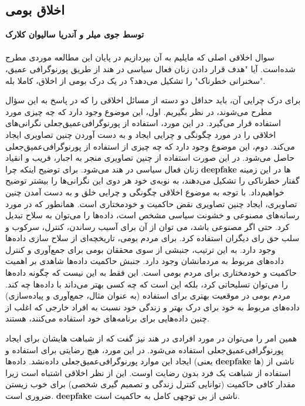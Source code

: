 {
\subsection*{اخلاق بومی}
\label{subsec:اخلاق بومی}
\noindent \textbf{توسط جوی میلر و آندریا سالیوان کلارک}
\\\\
سوال اخلاقی اصلی که مایلیم به آن بپردازیم در پایان این مطالعه موردی مطرح شده‌است. آیا "هدف قرار دادن زنان فعال سیاسی در هند از طریق پورنوگرافی عمیق، "سخنرانی خطرناک" را تشکیل می‌دهد؟ در یک درک بومی از اخلاق، کاملا بله.
}

برای درک چرایی آن، باید حداقل دو دسته از مسائل اخلاقی را که در پاسخ به این سؤال مطرح می‌شوند، در نظر بگیریم.
اول، این موضوع وجود دارد که چه چیزی مورد استفاده قرار می‌گیرد.
در این مورد، استفاده از پورنوگرافی‌عمیق‌جعلی نگرانی‌های اخلاقی را در مورد چگونگی و چرایی ایجاد و به دست آوردن چنین تصاویری ایجاد می‌کند.
دوم، این موضوع وجود دارد که چه چیزی از استفاده از پورنوگرافی‌عمیق‌جعلی حاصل می‌شود.
در این صورت استفاده از چنین تصاویری منجر به اجبار، فریب و انقیاد زنان فعال سیاسی در هند می‌شود.
برای توضیح اینکه چرا \textenglish{\textbf{deepfake}} ها در این زمینه گفتار خطرناکی را تشکیل می‌دهند، به نوبه‌ی خود هر دوی این نگرانی‌ها را بیشتر توضیح خواهیم‌داد.
با توجه به موضوع اخلاقی چگونگی و چرایی خلق و به دست آمدن چنین تصاویری، ایجاد چنین تصاویری نقض حاکمیت و خودمختاری است.
همانطور که در مورد رسانه‌های مصنوعی و خشونت سیاسی مشخص است، داده‌ها را می‌توان به سلاح تبدیل کرد.
حتی اگر مصنوعی باشد، می توان از آن برای آسیب رساندن، کنترل، سرکوب و سلب حق رای دیگران استفاده کرد.
برای مردم بومی، تاریخچه‌ای از سلاح سازی داده‌ها وجود دارد.
به این ترتیب، جنبشی از سوی محققان بومی برای جمع‌آوری و کنترل داده‌های مربوط به مردمانشان وجود دارد.
جنبش حاکمیت داده‌ها شاهدی بر اهمیت حاکمیت و خودمختاری برای مردم بومی است.
این فقط به این نیست که چگونه داده‌ها را می‌توان تسلیحاتی کرد، بلکه این است که چه کسی بهتر می‌داند با داده‌ها چه کند.
مردم بومی در موقعیت بهتری برای استفاده (به عنوان مثال، جمع‌آوری و پیاده‌سازی) داده‌های مربوط به خود برای درک بهتر و زندگی خود نسبت به افراد خارجی که اغلب از چنین داده‌هایی برای برنامه‌های خود استفاده می‌کنند، هستند.

همین امر را می‌توان در مورد افرادی در هند نیز گفت که از شباهت هایشان برای ایجاد پورنوگرافی‌عمیق‌جعلی استفاده می‌شود.
در این مورد، هیچ رضایتی برای استفاده و ایجاد این موارد پورنوگرافی‌عمیق‌جعلی داده‌نشد.
داده‌ها (یعنی \textenglish{\textbf{deepfake}} ها) ناشی از استفاده از شباهت یک فرد بدون رضایت اوست.
این از نظر اخلاقی اشتباه است زیرا مقدار کافی حاکمیت (توانایی کنترل زندگی و تصمیم گیری شخصی) برای خوب زیستن ضروری است.
\textenglish{\textbf{deepfake}} ناشی از بی توجهی کامل به حاکمیت است.

